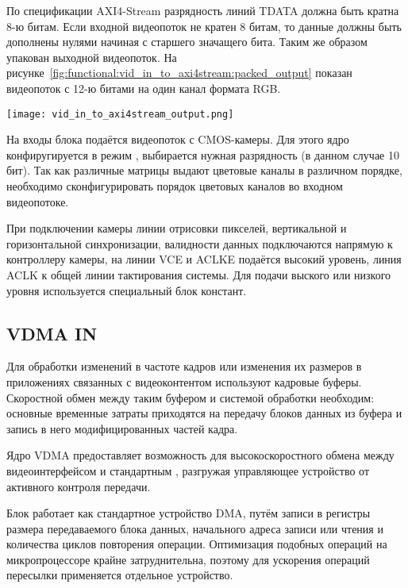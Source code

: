 По спецификации AXI4-Stream разрядность линий TDATA должна быть кратна 8-ю битам. %
Если входной видеопоток не кратен 8 битам, то данные должны быть дополнены нулями
начиная с старшего значащего бита. Таким же образом упакован выходной видеопоток.
На рисунке~\ref{fig:functional:vid_in_to_axi4stream:packed_output} показан
видеопоток с 12-ю битами на один канал формата RGB.

\begin{center}
  \centering
  \texttt{[image: vid\_in\_to\_axi4stream\_output.png]}
  \label{fig:functional:vid_in_to_axi4stream:packed_output}
\end{center}

На входы блока подаётся видеопоток с CMOS-камеры. Для этого ядро конфиругируется в режим
, выбирается нужная разрядность (в данном случае 10 бит). Так как различные
матрицы выдают цветовые каналы в различном порядке, необходимо сконфигурировать порядок цветовых
каналов во входном видеопотоке.

При подключении камеры линии отрисовки пикселей, вертикальной и горизонтальной синхронизации,
валидности данных подключаются напрямую к контроллеру камеры, на линии VCE и ACLKE подаётся высокий уровень,
линия ACLK к общей линии тактирования системы. Для подачи выского или низкого уровня используется
специальный блок констант.


\subsection{VDMA IN}
\label{sec:functional:vdma_in}
Для обработки изменений в частоте кадров или изменения их размеров в приложениях
связанных с видеоконтентом используют кадровые буферы. Скоростной обмен между
таким буфером и системой обработки необходим: основные временные затраты
приходятся на передачу блоков данных из буфера и запись в него модифицированных частей кадра.

Ядро VDMA предоставляет возможность для высокоскоростного обмена между  видеоинтерфейсом
и стандартным , разгружая управляющее устройство от активного контроля передачи.

Блок работает как стандартное устройство DMA, путём записи в регистры размера передаваемого блока данных,
начального адреса записи или чтения и количества циклов повторения операции. Оптимизация подобных
операций на микропроцессоре крайне затруднительна, поэтому для ускорения операций пересылки применяется
отдельное устройство.

